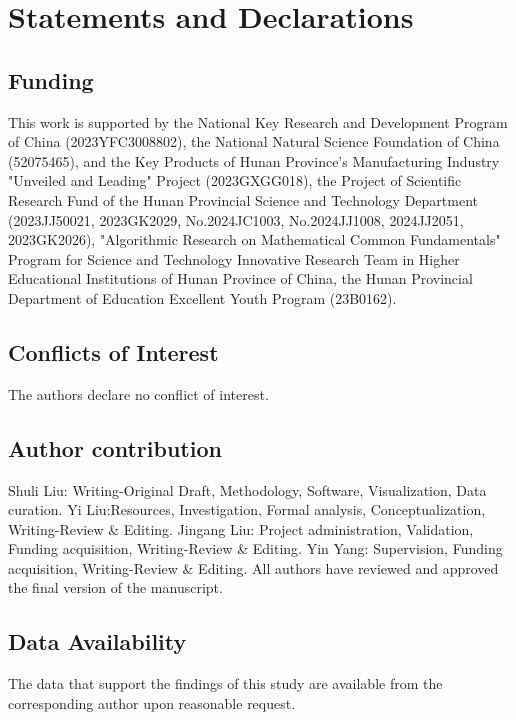 \documentclass[pdflatex,sn-mathphys-num]{sn-jnl}%
\theoremstyle{thmstyleone}%
\theoremstyle{thmstyletwo}%
\theoremstyle{thmstylethree}%
\begin{document}
\section*{Statements and Declarations}
\subsection*{Funding}

This work is supported by the National Key Research and Development Program of China (2023YFC3008802), the National Natural Science Foundation of China (52075465), and the Key Products of Hunan Province's Manufacturing Industry "Unveiled and Leading" Project (2023GXGG018), the Project of Scientific Research Fund of the Hunan Provincial Science and Technology Department (2023JJ50021, 2023GK2029, No.2024JC1003, No.2024JJ1008, 2024JJ2051, 2023GK2026), "Algorithmic Research on Mathematical Common Fundamentals" Program for Science and Technology Innovative Research Team in Higher Educational Institutions of Hunan Province of China, the Hunan Provincial Department of Education Excellent Youth Program (23B0162).

\subsection*{Conflicts of Interest}
The authors declare no conflict of interest.

\subsection*{Author contribution}
Shuli Liu: Writing-Original Draft, Methodology, Software, Visualization, Data curation. Yi Liu:Resources, Investigation, Formal analysis, Conceptualization, Writing-Review \& Editing. 
Jingang Liu: Project administration, Validation, Funding acquisition, Writing-Review \& Editing. 
Yin Yang: Supervision, Funding acquisition, Writing-Review \& Editing. 
All authors have reviewed and approved the final version of the manuscript.
\subsection*{Data Availability}
The data that support the findings of this study are available from the corresponding author upon reasonable request.
\end{document}
